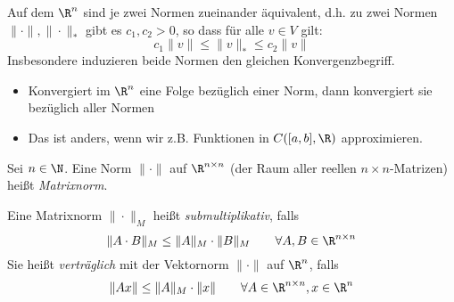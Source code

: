 \documentclass[a4paper]{scrartcl}
\numberwithin{equation}{section}
\begin{document}
\setcounter{thm}{8}
\begin{st}
\label{st:2.9}
Auf dem $\R^n$ sind je zwei Normen zueinander äquivalent, 
d.h. zu zwei Normen $\|\cdot\|, \|\cdot\|_*$ gibt es $c_1, c_2>0$, so dass für alle $v\in V$ gilt:
\[
c_1\|v\| \le \|v\|_* \le c_2\|v\|
\]
Insbesondere induzieren beide Normen den gleichen Konvergenzbegriff.
\begin{note}
\begin{itemize}
\item 
Konvergiert im $\R^n$ eine Folge bezüglich einer Norm, dann konvergiert sie bezüglich aller Normen
\item
Das ist anders, wenn wir z.B. Funktionen in $C([a,b],\R)$ approximieren.
\end{itemize}
\end{note}
\end{st}


\begin{df}
\label{df:2.10}
Sei $n\in \N$. 
Eine Norm $\|\cdot\|$ auf $\R^{n\times n}$ (der Raum aller reellen $n\times n$-Matrizen) heißt \emph{Matrixnorm}.

Eine Matrixnorm $\|\cdot\|_M$ heißt \emph{submultiplikativ}, falls
\[
\|A\cdot B\|_M\le \|A\|_M\cdot \|B\|_M \qquad \forall A,B\in \R^{n\times n}
\]
Sie heißt \emph{verträglich} mit der Vektornorm $\|\cdot\|$ auf $\R^n$, falls
\[
\|Ax\|\le \|A\|_M\cdot \|x\|  \qquad \forall A\in \R^{n\times n}, x\in \R^n
\]
\end{df}
\end{document}
